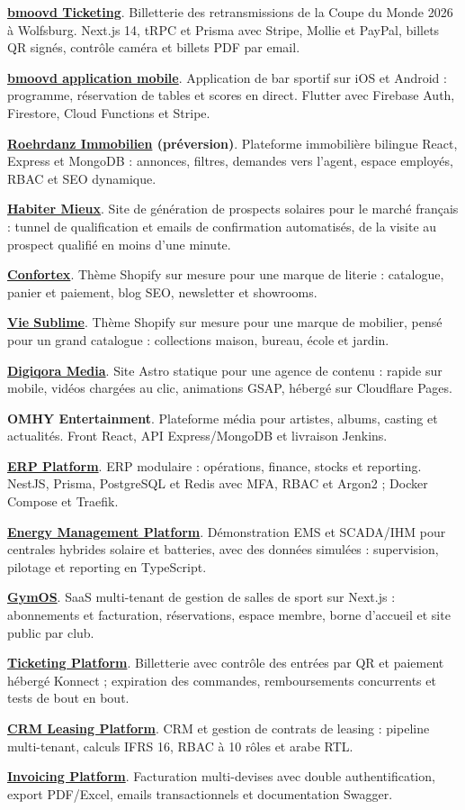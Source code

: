\documentclass[11pt,a4paper]{article}
\newcommand{\group}[1]{\Needspace{4\baselineskip}\vspace{4pt}{\bfseries\color{accent}#1}\par}
\newcommand{\project}[2]{\Needspace{3\baselineskip}\textbf{#1}. #2\par}
\begin{document}
\group{Projets clients (freelance)}
\project{\href{https://bmoovd-shop.com}{bmoovd Ticketing}}{Billetterie des retransmissions de la Coupe du Monde 2026 à Wolfsburg. Next.js 14, tRPC et Prisma avec Stripe, Mollie et PayPal, billets QR signés, contrôle caméra et billets PDF par email.}
\project{\href{https://apps.apple.com/de/app/bmoovd/id6736364332}{bmoovd application mobile}}{Application de bar sportif sur iOS et Android : programme, réservation de tables et scores en direct. Flutter avec Firebase Auth, Firestore, Cloud Functions et Stripe.}
\project{\href{https://rimmobilien-test.de/}{Roehrdanz Immobilien} (préversion)}{Plateforme immobilière bilingue React, Express et MongoDB : annonces, filtres, demandes vers l'agent, espace employés, RBAC et SEO dynamique.}
\project{\href{https://habiter-mieux.info/}{Habiter Mieux}}{Site de génération de prospects solaires pour le marché français : tunnel de qualification et emails de confirmation automatisés, de la visite au prospect qualifié en moins d'une minute.}
\project{\href{https://confortex.shop/}{Confortex}}{Thème Shopify sur mesure pour une marque de literie : catalogue, panier et paiement, blog SEO, newsletter et showrooms.}
\project{\href{https://www.viesublime.tn/}{Vie Sublime}}{Thème Shopify sur mesure pour une marque de mobilier, pensé pour un grand catalogue : collections maison, bureau, école et jardin.}
\project{\href{https://digiqora-media.pages.dev}{Digiqora Media}}{Site Astro statique pour une agence de contenu : rapide sur mobile, vidéos chargées au clic, animations GSAP, hébergé sur Cloudflare Pages.}
\project{OMHY Entertainment}{Plateforme média pour artistes, albums, casting et actualités. Front React, API Express/MongoDB et livraison Jenkins.}

\group{Produits}
\project{\href{https://erp.products.axynoxia.com}{ERP Platform}}{ERP modulaire : opérations, finance, stocks et reporting. NestJS, Prisma, PostgreSQL et Redis avec MFA, RBAC et Argon2 ; Docker Compose et Traefik.}
\project{\href{https://energie.products.axynoxia.com}{Energy Management Platform}}{Démonstration EMS et SCADA/IHM pour centrales hybrides solaire et batteries, avec des données simulées : supervision, pilotage et reporting en TypeScript.}
\project{\href{https://gymos.products.axynoxia.com}{GymOS}}{SaaS multi-tenant de gestion de salles de sport sur Next.js : abonnements et facturation, réservations, espace membre, borne d'accueil et site public par club.}
\project{\href{https://tickets.products.axynoxia.com}{Ticketing Platform}}{Billetterie avec contrôle des entrées par QR et paiement hébergé Konnect ; expiration des commandes, remboursements concurrents et tests de bout en bout.}
\project{\href{https://crm-leasing.products.axynoxia.com}{CRM Leasing Platform}}{CRM et gestion de contrats de leasing : pipeline multi-tenant, calculs IFRS 16, RBAC à 10 rôles et arabe RTL.}
\project{\href{https://invoice.products.axynoxia.com}{Invoicing Platform}}{Facturation multi-devises avec double authentification, export PDF/Excel, emails transactionnels et documentation Swagger.}
\end{document}
